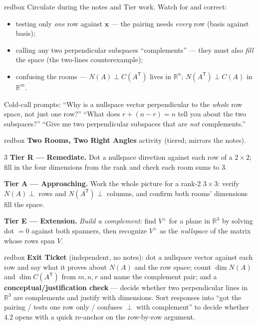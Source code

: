 \documentclass[10pt]{article}
\newcommand{\xx}{\mathbf{x}}
\newcommand{\T}{\mathsf{T}}
\begin{document}
\begin{skillbox}{redbox}
Circulate during the notes and Tier work. Watch for and correct:
\begin{itemize}[leftmargin=1.2em, nosep]
  \item testing only \emph{one} row against $\xx$ --- the pairing needs \emph{every} row (basis against basis);
  \item calling any two perpendicular subspaces ``complements'' --- they must also \emph{fill} the space
        (the two-lines counterexample);
  \item confusing the rooms --- $N(A)\perp C(A^{\T})$ lives in $\mathbb{R}^n$; $N(A^{\T})\perp C(A)$ in $\mathbb{R}^m$.
\end{itemize}
Cold-call prompts: ``Why is a nullspace vector perpendicular to the \emph{whole} row space, not just one
row?'' ``What does $r+(n-r)=n$ tell you about the two subspaces?'' ``Give me two perpendicular subspaces
that are \emph{not} complements.''
\end{skillbox}

\begin{skillbox}{redbox}
\textbf{Two Rooms, Two Right Angles} activity (tiered; mirrors the notes).
\begin{multicols}{3}
\textbf{Tier R --- Remediate.} Dot a nullspace direction against each row of a $2\times2$; fill in the
four dimensions from the rank and check each room sums to $3$.

\columnbreak
\textbf{Tier A --- Approaching.} Work the whole picture for a rank-2 $3\times3$: verify $N(A)\perp$ rows
and $N(A^{\T})\perp$ columns, and confirm both rooms' dimensions fill the space.

\columnbreak
\textbf{Tier E --- Extension.} \emph{Build a complement:} find $V^{\perp}$ for a plane in $\mathbb{R}^3$
by solving dot $=0$ against both spanners, then recognize $V^{\perp}$ as the \emph{nullspace} of the
matrix whose rows span $V$.
\end{multicols}
\end{skillbox}

\begin{skillbox}{redbox}
\textbf{Exit Ticket} (independent, no notes): dot a nullspace vector against each row and say what it
proves about $N(A)$ and the row space; count $\dim N(A)$ and $\dim C(A^{\T})$ from $m,n,r$ and name the
complement pair; and a \textbf{conceptual/justification check} --- decide whether two perpendicular lines
in $\mathbb{R}^3$ are complements and justify with dimensions. Sort responses into ``got the pairing /
tests one row only / confuses $\perp$ with complement'' to decide whether 4.2 opens with a quick
re-anchor on the row-by-row argument.
\end{skillbox}
\end{document}
